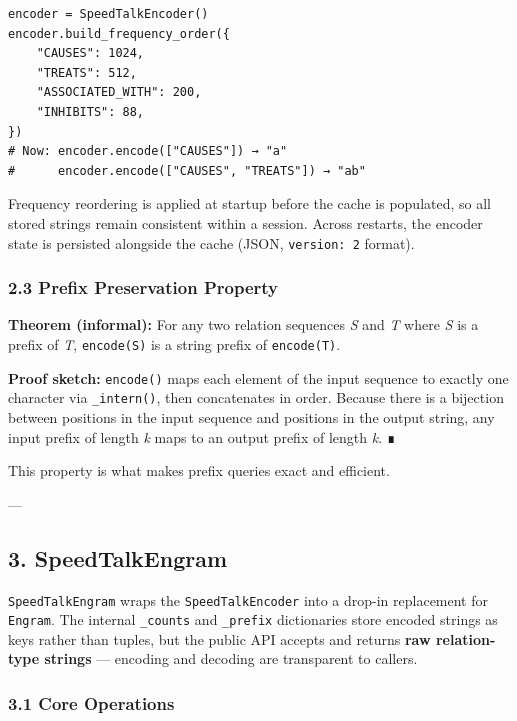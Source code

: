 \begin{lstlisting}
encoder = SpeedTalkEncoder()
encoder.build_frequency_order({
    "CAUSES": 1024,
    "TREATS": 512,
    "ASSOCIATED_WITH": 200,
    "INHIBITS": 88,
})
# Now: encoder.encode(["CAUSES"]) → "a"
#      encoder.encode(["CAUSES", "TREATS"]) → "ab"
\end{lstlisting}

Frequency reordering is applied at startup before the cache is populated, so all
stored strings remain consistent within a session.  Across restarts, the encoder
state is persisted alongside the cache (JSON, \texttt{version: 2} format).

\subsubsection{2.3 Prefix Preser\-vation Property}

\textbf{Theorem (informal):} For any two relation sequences \textit{S} and \textit{T} where \textit{S} is a
prefix of \textit{T}, \texttt{encode(S)} is a string prefix of \texttt{encode(T)}.

\textbf{Proof sketch:} \texttt{encode()} maps each element of the input sequence to exactly one
character via \texttt{\_intern()}, then conca\-tenates in order.  Because there is a bijection
between positions in the input sequence and positions in the output string, any input
prefix of length \textit{k} maps to an output prefix of length \textit{k}.  ∎

This property is what makes prefix queries exact and efficient.

---

\subsection{3. SpeedTalkEngram}

\texttt{SpeedTalkEngram} wraps the \texttt{SpeedTalkEncoder} into a drop-in replacement for
\texttt{Engram}.  The internal \texttt{\_counts} and \texttt{\_prefix} dicti\-onaries store \textit{}encoded
strings\textit{} as keys rather than tuples, but the public API accepts and returns
\textbf{raw relation-type strings} — encoding and decoding are transparent to callers.

\subsubsection{3.1 Core Operations}

